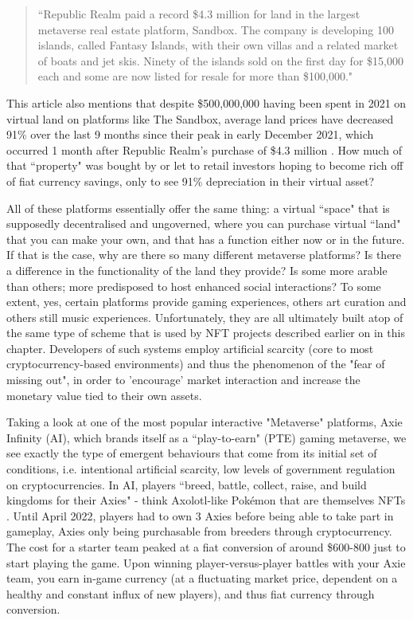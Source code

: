 \begin{quote}
    ``Republic Realm paid a record \$4.3 million for land in the largest metaverse real estate platform, Sandbox. The company is developing 100 islands, called Fantasy Islands, with their own villas and a related market of boats and jet skis. Ninety of the islands sold on the first day for \$15,000 each and some are now listed for resale for more than \$100,000." \citep[]{frank2022}
\end{quote}
This article also mentions that despite \$500,000,000 having been spent in 2021 on virtual land on platforms like The Sandbox, average land prices have decreased 91\% over the last 9 months since their peak in early December 2021, which occurred 1 month after Republic Realm's purchase of \$4.3 million \citep[]{kane2022}. How much of that ``property" was bought by or let to retail investors hoping to become rich off of fiat currency savings, only to see 91\% depreciation in their virtual asset? 

All of these platforms essentially offer the same thing: a virtual ``space" that is supposedly decentralised and ungoverned, where you can purchase virtual ``land" that you can make your own, and that has a function either now or in the future. If that is the case, why are there so many different metaverse platforms? Is there a difference in the functionality of the land they provide? Is some more arable than others; more predisposed to host enhanced social interactions? To some extent, yes, certain platforms provide gaming experiences, others art curation and others still music experiences. Unfortunately, they are all ultimately built atop of the same type of scheme that is used by NFT projects described earlier on in this chapter. Developers of such systems employ artificial scarcity (core to most cryptocurrency-based environments) and thus the phenomenon of the "fear of missing out", in order to 'encourage' market interaction and increase the monetary value tied to their own assets.

Taking a look at one of the most popular interactive "Metaverse" platforms, Axie Infinity (AI), which brands itself as a ``play-to-earn" (PTE) gaming metaverse, we see exactly the type of emergent behaviours that come from its initial set of conditions, i.e. intentional artificial scarcity, low levels of government regulation on cryptocurrencies. In AI, players ``breed, battle, collect, raise, and build kingdoms for their Axies" - think Axolotl-like Pokémon that are themselves NFTs \citep[]{skymavis2022}. Until April 2022, players had to own 3 Axies before being able to take part in gameplay, Axies only being purchasable from breeders through cryptocurrency. The cost for a starter team peaked at a fiat conversion of around \$600-800 just to start playing the game. Upon winning player-versus-player battles with your Axie team, you earn in-game currency (at a fluctuating market price, dependent on a healthy and constant influx of new players), and thus fiat currency through conversion.

